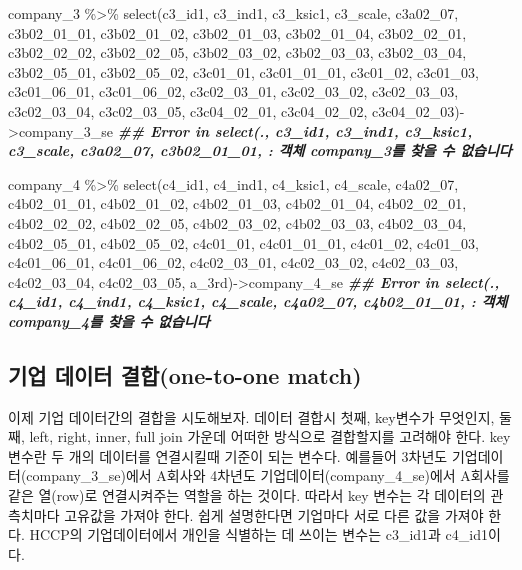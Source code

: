 \documentclass[
]{book}
\newenvironment{Shaded}{\begin{snugshade}}{\end{snugshade}}
\newcommand{\DocumentationTok}[1]{\textcolor[rgb]{0.56,0.35,0.01}{\textbf{\textit{#1}}}}
\newcommand{\FunctionTok}[1]{\textcolor[rgb]{0.00,0.00,0.00}{#1}}
\newcommand{\NormalTok}[1]{#1}
\newcommand{\OtherTok}[1]{\textcolor[rgb]{0.56,0.35,0.01}{#1}}
\newcommand{\SpecialCharTok}[1]{\textcolor[rgb]{0.00,0.00,0.00}{#1}}
\theoremstyle{definition}
\theoremstyle{definition}
\theoremstyle{definition}
\theoremstyle{definition}
\theoremstyle{remark}
\begin{document}
\begin{Shaded}
\begin{Highlighting}[]
\NormalTok{company\_3 }\SpecialCharTok{\%\textgreater{}\%} 
  \FunctionTok{select}\NormalTok{(c3\_id1, c3\_ind1, c3\_ksic1, c3\_scale, c3a02\_07, c3b02\_01\_01, c3b02\_01\_02, c3b02\_01\_03, c3b02\_01\_04, c3b02\_02\_01, c3b02\_02\_02, c3b02\_02\_05, c3b02\_03\_02, c3b02\_03\_03, c3b02\_03\_04, c3b02\_05\_01, c3b02\_05\_02, c3c01\_01, c3c01\_01\_01, c3c01\_02, c3c01\_03, c3c01\_06\_01, c3c01\_06\_02, c3c02\_03\_01, c3c02\_03\_02, c3c02\_03\_03, c3c02\_03\_04, c3c02\_03\_05, c3c04\_02\_01, c3c04\_02\_02, c3c04\_02\_03)}\OtherTok{{-}\textgreater{}}\NormalTok{company\_3\_se}
\DocumentationTok{\#\# Error in select(., c3\_id1, c3\_ind1, c3\_ksic1, c3\_scale, c3a02\_07, c3b02\_01\_01, : 객체 \textquotesingle{}company\_3\textquotesingle{}를 찾을 수 없습니다}

\NormalTok{company\_4 }\SpecialCharTok{\%\textgreater{}\%} 
  \FunctionTok{select}\NormalTok{(c4\_id1, c4\_ind1, c4\_ksic1, c4\_scale, c4a02\_07, c4b02\_01\_01, c4b02\_01\_02, c4b02\_01\_03, c4b02\_01\_04, c4b02\_02\_01, c4b02\_02\_02, c4b02\_02\_05, c4b02\_03\_02, c4b02\_03\_03, c4b02\_03\_04, c4b02\_05\_01, c4b02\_05\_02, c4c01\_01, c4c01\_01\_01, c4c01\_02, c4c01\_03, c4c01\_06\_01, c4c01\_06\_02, c4c02\_03\_01, c4c02\_03\_02, c4c02\_03\_03, c4c02\_03\_04, c4c02\_03\_05, a\_3rd)}\OtherTok{{-}\textgreater{}}\NormalTok{company\_4\_se}
\DocumentationTok{\#\# Error in select(., c4\_id1, c4\_ind1, c4\_ksic1, c4\_scale, c4a02\_07, c4b02\_01\_01, : 객체 \textquotesingle{}company\_4\textquotesingle{}를 찾을 수 없습니다}
\end{Highlighting}
\end{Shaded}

\hypertarget{uxae30uxc5c5-uxb370uxc774uxd130-uxacb0uxd569one-to-one-match}{%
\subsection{기업 데이터 결합(one-to-one match)}\label{uxae30uxc5c5-uxb370uxc774uxd130-uxacb0uxd569one-to-one-match}}

이제 기업 데이터간의 결합을 시도해보자. 데이터 결합시 첫째, key변수가 무엇인지, 둘째, left, right, inner, full join 가운데 어떠한 방식으로 결합할지를 고려해야 한다. key 변수란 두 개의 데이터를 연결시킬때 기준이 되는 변수다. 예를들어 3차년도 기업데이터(company\_3\_se)에서 A회사와 4차년도 기업데이터(company\_4\_se)에서 A회사를 같은 열(row)로 연결시켜주는 역할을 하는 것이다. 따라서 key 변수는 각 데이터의 관측치마다 고유값을 가져야 한다. 쉽게 설명한다면 기업마다 서로 다른 값을 가져야 한다. HCCP의 기업데이터에서 개인을 식별하는 데 쓰이는 변수는 c3\_id1과 c4\_id1이다.
\end{document}
